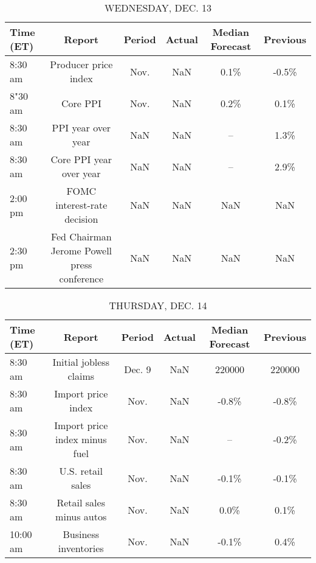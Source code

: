 \documentclass{article}%
\begin{document}
\begin{table}[htbp]%
\caption{WEDNESDAY, DEC. 13}%
\centering%
\begin{adjustbox}{width=1\textwidth}%
\begin{tabular}{lccccc}
\toprule
Time (ET) &                                      Report & Period & Actual & Median Forecast & Previous \\
\midrule
  8:30 am &                        Producer price index &   Nov. &    NaN &            0.1\% &    -0.5\% \\
  8"30 am &                                    Core PPI &   Nov. &    NaN &            0.2\% &     0.1\% \\
  8:30 am &                          PPI year over year &    NaN &    NaN &              -- &     1.3\% \\
  8:30 am &                     Core PPI year over year &    NaN &    NaN &              -- &     2.9\% \\
  2:00 pm &                 FOMC interest-rate decision &    NaN &    NaN &             NaN &      NaN \\
  2:30 pm & Fed Chairman Jerome Powell press conference &    NaN &    NaN &             NaN &      NaN \\
\bottomrule
\end{tabular}
%
\end{adjustbox}%
\end{table}

%


\begin{table}[htbp]%
\caption{THURSDAY, DEC. 14}%
\centering%
\begin{adjustbox}{width=1\textwidth}%
\begin{tabular}{lccccc}
\toprule
Time (ET) &                        Report & Period & Actual & Median Forecast & Previous \\
\midrule
  8:30 am &        Initial jobless claims & Dec. 9 &    NaN &          220000 &   220000 \\
  8:30 am &            Import price index &   Nov. &    NaN &           -0.8\% &    -0.8\% \\
  8:30 am & Import price index minus fuel &   Nov. &    NaN &              -- &    -0.2\% \\
  8:30 am &             U.S. retail sales &   Nov. &    NaN &           -0.1\% &    -0.1\% \\
  8:30 am &      Retail sales minus autos &   Nov. &    NaN &            0.0\% &     0.1\% \\
 10:00 am &          Business inventories &   Nov. &    NaN &           -0.1\% &     0.4\% \\
\bottomrule
\end{tabular}
%
\end{adjustbox}%
\end{table}
\end{document}
